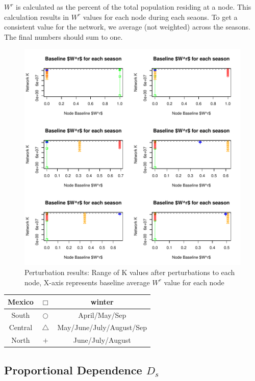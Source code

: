 \documentclass[10pt]{article}
\begin{document}
$W^r$ is calculated as the percent of the total population residing at a node. This calculation results in $W^r$ values for each node during each seaons. To get a consistent value for the network, we average (not weighted) across the seasons. The final numbers should sum to one.


\vspace{-.5cm}
\begin{figure}[H]
\begin{center}
\includegraphics[width=.8\textwidth, height=.8\textwidth]{RGraphics-monarch_barcr_WR}
\caption{Perturbation results: Range of K values after perturbations to each node, X-axis represents baseline average $W^r$ value for each node}\label{fig:monarch_barcr_WR}
\end{center}
\end{figure}

\vspace{-.5cm}
\begin{tabular}{|c|c|c|}
\hline
{\color{red} Mexico} & $\Box$ & winter \\
\hline
{\color{orange} South} & $\bigcirc$ & April/May/Sep \\
\hline
{\color{blue} Central} & $\triangle$ &  May/June/July/August/Sep \\
\hline
{\color{green} North} & $+$ & June/July/August \\
\hline
\end{tabular}




\newpage
\subsection{Proportional Dependence \texorpdfstring{$D_s$}{DS}}
\end{document}
